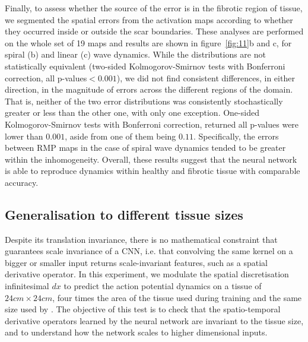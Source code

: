 \documentclass[utf8]{frontiersSCNS} %
\begin{document}
Finally, to assess whether the source of the error is in the fibrotic region of tissue, we segmented the spatial errors from the activation maps according to whether they occurred inside or outside the scar boundaries. These analyses are performed on the whole set of 19 maps and results are shown in figure~\ref{fig:11}b and c, for spiral (b) and linear (c) wave dynamics. 
While the distributions are not statistically equivalent (two-sided Kolmogorov-Smirnov tests with Bonferroni correction, all p-values$<0.001$), we did not find consistent differences, in either direction, in the magnitude of errors across the different regions of the domain. That is, neither of the two error distributions was consistently stochastically greater or less than the other one, with only one exception. One-sided Kolmogorov-Smirnov tests with Bonferroni correction, returned all p-values were lower than $0.001$, aside from one of them being $0.11$. Specifically, the errors between RMP maps in the case of spiral wave dynamics tended to be greater within the inhomogeneity. 
Overall, these results suggest that the neural network is able to reproduce dynamics within healthy and fibrotic tissue with comparable accuracy.


\subsection{Generalisation to different tissue sizes}
\label{sec:results:tissue_size}
Despite its translation invariance, there is no mathematical constraint that guarantees scale invariance of a CNN, i.e. that convolving the same kernel on a bigger or smaller input returns scale-invariant features, such as a spatial derivative operator.
%
In this experiment, we modulate the spatial discretisation infinitesimal $dx$ to predict the action potential dynamics on a tissue of $24cm \times 24cm$, four times the area of the tissue used during training and the same size used by \cite{Herzog2018}.
The objective of this test is to check that the spatio-temporal derivative operators learned by the neural network are invariant to the tissue size, and to understand how the network scales to higher dimensional inputs.
\end{document}
